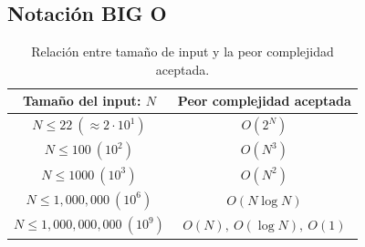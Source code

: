 \subsection{Notación BIG O}
\begin{table}[h!]
	\centering
	\begin{tabular}{|c|c|}
		\hline
		\textbf{Tamaño del input: $N$} & \textbf{Peor complejidad aceptada} \\ \hline
		$N \leq 22 \ (\approx 2 \cdot 10^1)$ & $O(2^N)$ \\ \hline
		$N \leq 100 \ (10^2)$ & $O(N^3)$ \\ \hline
		$N \leq 1000 \ (10^3)$ & $O(N^2)$ \\ \hline
		$N \leq 1{,}000{,}000 \ (10^6)$ & $O(N \log N)$ \\ \hline
		$N \leq 1{,}000{,}000{,}000 \ (10^9)$ & $O(N),\ O(\log N),\ O(1)$ \\ \hline
	\end{tabular}
	\caption{Relación entre tamaño de input y la peor complejidad aceptada.}
\end{table}

